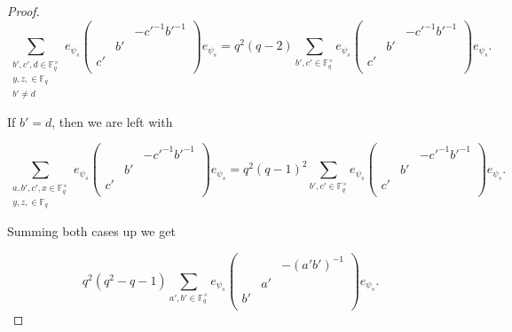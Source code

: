 \documentclass[12pt,reqno]{amsart}
\theoremstyle{definition}
\theoremstyle{remark}
\numberwithin{equation}{section}
\begin{document}
\begin{proof}
    \begin{equation*}
        \sum_{\substack{b', c', d \in \mathbb{F}_q^\times\\y, z, \in \mathbb{F}_q\\b' \ne d}}e_{\psi_s} \begin{pmatrix}
            & & -c'^{-1}b'^{-1}\\
            & b' & \\
            c' & &\\
        \end{pmatrix} e_{\psi_s}= q^2(q-2)\sum_{b', c' \in \mathbb{F}_q^\times}e_{\psi_s} \begin{pmatrix}
            & & -c'^{-1}b'^{-1}\\
            & b' & \\
            c' & &\\
        \end{pmatrix} e_{\psi_s}.
    \end{equation*}

    If $b' = d$, then we are left with

    \begin{equation*}
        \sum_{\substack{a, b', c', x \in \mathbb{F}_q^\times\\y, z, \in \mathbb{F}_q}}e_{\psi_s} \begin{pmatrix}
            & & -c'^{-1}b'^{-1}\\
            & b' & \\
            c' & &\\
        \end{pmatrix} e_{\psi_s}= q^2 (q-1)^2 \sum_{b', c' \in \mathbb{F}_q^\times}e_{\psi_s} \begin{pmatrix}
            & & -c'^{-1}b'^{-1}\\
            & b' & \\
            c' & &\\
        \end{pmatrix} e_{\psi_s}.
    \end{equation*}

    Summing both cases up we get
    
    \begin{equation*}
         q^2(q^2-q-1)\sum_{a',b'\in\mathbb{F}_q^{\times}}e_{\psi_s} \begin{pmatrix}
            & & -(a'b')^{-1}\\
            & a' & \\
            b' & &\\
        \end{pmatrix} e_{\psi_s}.
    \end{equation*}
\end{proof}
\end{document}

